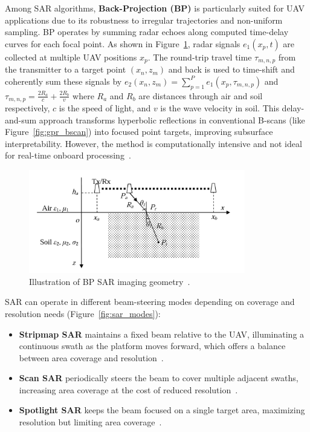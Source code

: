 Among \gls{SAR} algorithms, \textbf{Back-Projection (\gls{BP})} is particularly suited for \gls{UAV} applications due to its robustness to irregular trajectories and non-uniform sampling. \gls{BP} operates by summing radar echoes along computed time-delay curves for each focal point. As shown in Figure~\ref{fig:bp_geometry}, radar signals $e_1(x_p, t)$ are collected at multiple \gls{UAV} positions $x_p$. The round-trip travel time $\tau_{m,n,p}$ from the transmitter to a target point $(x_n, z_m)$ and back is used to time-shift and coherently sum these signals by \(e_2(x_n, z_m) = \sum_{p=1}^{P} e_1(x_p, \tau_{m,n,p})\) and \(\tau_{m,n,p} = \frac{2R_a}{c} + \frac{2R_b}{v}\) where $R_a$ and $R_b$ are distances through air and soil respectively, $c$ is the speed of light, and $v$ is the wave velocity in soil. This delay-and-sum approach transforms hyperbolic reflections in conventional B-scans (like Figure~\ref{fig:gpr_bscan}) into focused point targets, improving subsurface interpretability. However, the method is computationally intensive and not ideal for real-time onboard processing~\cite{lei2014multi}.

\begin{figure}[H]
    \centering
    \includegraphics[height=4.5cm]{figs/Huirui/bp_geometry.png}
    \caption{Illustration of \gls{BP} \gls{SAR} imaging geometry~\cite{lei2014multi}.}
    \label{fig:bp_geometry}
\end{figure}


\gls{SAR} can operate in different beam-steering modes depending on coverage and resolution needs (Figure~\ref{fig:sar_modes}):

\begin{itemize}
    \item \textbf{Stripmap \gls{SAR}} maintains a fixed beam relative to the \gls{UAV}, illuminating a continuous swath as the platform moves forward, which offers a balance between area coverage and resolution~\cite{moreira2013tutorial}.
    \item \textbf{Scan \gls{SAR}} periodically steers the beam to cover multiple adjacent swaths, increasing area coverage at the cost of reduced resolution~\cite{moreira2013tutorial}.
    \item \textbf{Spotlight \gls{SAR}} keeps the beam focused on a single target area, maximizing resolution but limiting area coverage~\cite{moreira2013tutorial}.
\end{itemize}

